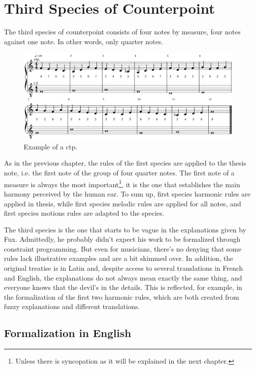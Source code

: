 \chapter{Third Species of Counterpoint}

The third species of counterpoint consists of four notes by measure, four notes against one note. In other words, only quarter notes.
\begin{figure}[h]
    \centering
    \includegraphics[width=5in]{Images/complete_third_species_f.png}
    \caption{Example of a  ctp.  }
\end{figure}

As in the previous chapter, the rules of the first species are applied to the thesis note, i.e. the first note of the group of four quarter notes. The first note of a measure is always the most important\footnote{Unless there is syncopation as it will be explained in the next chapter.}, it is the one that establishes the main harmony perceived by the human ear. To sum up, first species harmonic rules are applied in thesis, while first species melodic rules are applied for all notes, and first species motions rules are adapted to the species.

The third species is the one that starts to be vague in the explanations given by Fux. Admittedly, he probably didn't expect his work to be formalized through constraint programming. But even for musicians, there's no denying that some rules lack illustrative examples and are a bit skimmed over. In addition, the original treatise is in Latin and, despite access to several translations in French and English, the explanations do not always mean exactly the same thing, and everyone knows that the devil's in the details. This is reflected, for example, in the formalization of the first two harmonic rules, which are both created from fuzzy explanations and different translations.

\section{Formalization in English}

